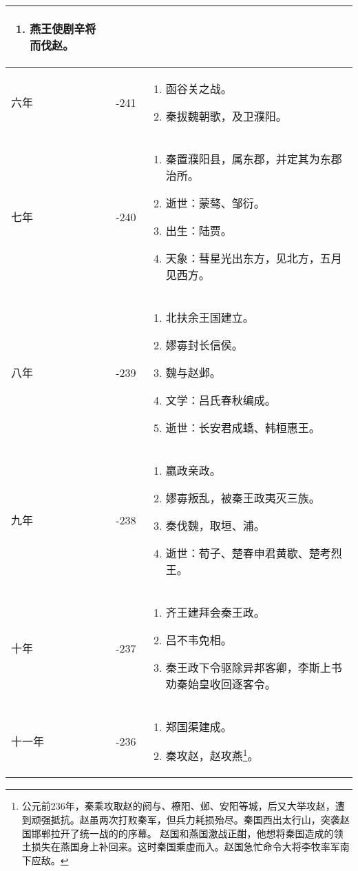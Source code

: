 \begin{longtable}{|>{\centering\scriptsize}m{2em}|>{\centering\scriptsize}m{1.3em}|>{\centering}m{9em}|}
\begin{enumerate}
  \item 燕王使剧辛将而伐赵。
  \end{enumerate} \tabularnewline\hline
  六年 & -241 & \begin{enumerate}
    \tiny
  \item 函谷关之战。
  \item 秦拔魏朝歌，及卫濮阳。
  \end{enumerate} \tabularnewline\hline
  七年 & -240 & \begin{enumerate}
    \tiny
  \item 秦置濮阳县，属东郡，并定其为东郡治所。
  \item 逝世：蒙骜、邹衍。
  \item 出生：陆贾。
  \item 天象：彗星光出东方，见北方，五月见西方。
  \end{enumerate} \tabularnewline\hline
  八年 & -239 & \begin{enumerate}
    \tiny
  \item 北扶余王国建立。
  \item 嫪毐封长信侯。
  \item 魏与赵邺。
  \item 文学：吕氏春秋编成。
  \item 逝世：长安君成蟜、韩桓惠王。
  \end{enumerate} \tabularnewline\hline
  九年 & -238 & \begin{enumerate}
    \tiny
  \item 嬴政亲政。
  \item 嫪毐叛乱，被秦王政夷灭三族。
  \item 秦伐魏，取垣、浦。
  \item 逝世：荀子、楚春申君黄歇、楚考烈王。
  \end{enumerate} \tabularnewline\hline
  十年 & -237 & \begin{enumerate}
    \tiny
  \item 齐王建拜会秦王政。
  \item 吕不韦免相。
  \item 秦王政下令驱除异邦客卿，李斯上书劝秦始皇收回逐客令。
  \end{enumerate} \tabularnewline\hline
  十一年 & -236 & \begin{enumerate}
    \tiny
  \item 郑国渠建成。
  \item 秦攻赵，赵攻燕\footnote{公元前236年，秦乘攻取赵的阏与、橑阳、邺、安阳等城，后又大举攻赵，遭到顽强抵抗。赵虽两次打败秦军，但兵力耗损殆尽。秦国西出太行山，突袭赵国邯郸拉开了统一战的的序幕。 赵国和燕国激战正酣，他想将秦国造成的领土损失在燕国身上补回来。这时秦国乘虚而入。赵国急忙命令大将李牧率军南下应敌。}。

\end{enumerate}
\end{longtable}
